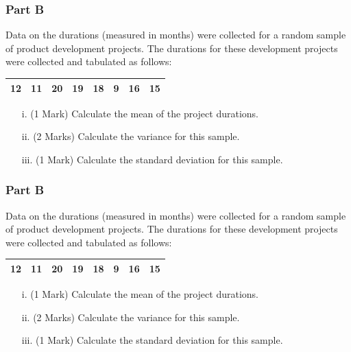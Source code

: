 \documentclass[a4paper,12pt]{article}
\begin{document}
\subsubsection*{Part B} %
Data on the durations (measured in months) were collected for a random sample of product development projects.
The durations for these development projects were collected and tabulated as follows:

\begin{table}[ht]
	\begin{center}
		\begin{tabular}{|rrrrrrrr|}
			
			\hline
			12 & 11 & 20 & 19 & 18 & 9 & 16 & 15 \\
			\hline
		\end{tabular}
	\end{center}
\end{table}

\begin{itemize}
	\item[i.](1 Mark) Calculate the mean of the project durations.
	\item[ii.](2 Marks) Calculate the variance for this sample.
	\item[iii.](1 Mark) Calculate the standard deviation for this sample.
\end{itemize}

\subsubsection*{Part B} %
Data on the durations (measured in months) were collected for a random sample of product development projects.
The durations for these development projects were collected and tabulated as follows:

\begin{table}[ht]
	\begin{center}
		\begin{tabular}{|rrrrrrrr|}
			
			\hline
			12 & 11 & 20 & 19 & 18 & 9 & 16 & 15 \\
			\hline
		\end{tabular}
	\end{center}
\end{table}

\begin{itemize}
	\item[i.](1 Mark) Calculate the mean of the project durations.
	\item[ii.](2 Marks) Calculate the variance for this sample.
	\item[iii.](1 Mark) Calculate the standard deviation for this sample.
\end{itemize}
\end{document}
